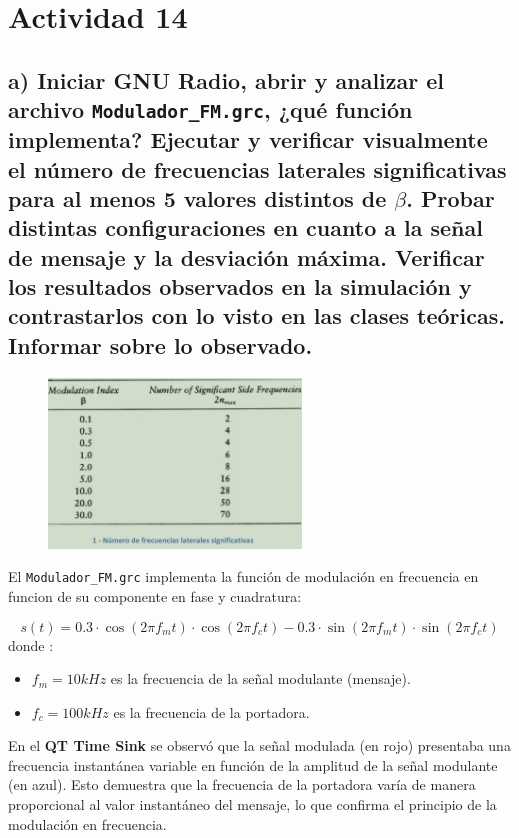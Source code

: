 \section{Actividad 14}

\subsection*{a) Iniciar GNU Radio, abrir y analizar el archivo \texttt{Modulador\_FM.grc}, ¿qué función implementa? Ejecutar y verificar visualmente el número de frecuencias laterales significativas para al menos 
5 valores distintos de $\beta$. Probar distintas configuraciones en cuanto a la señal de mensaje y la desviación máxima. Verificar los resultados observados en la simulación y contrastarlos con lo visto en las clases teóricas. Informar sobre lo observado.}

      \begin{figure}[H]
        \centering
        \includegraphics[width=0.6\textwidth]{imagenes/Parte_2/Actividad_14/fig6.png}
        \label{fig:6}
     \end{figure}

El \texttt{Modulador\_FM.grc} implementa la función de modulación en frecuencia en funcion de su componente en fase y cuadratura:

    \[
        s(t) = 0.3 \cdot \cos(2\pi f_m t) \cdot \cos(2\pi f_c t) - 0.3 \cdot \sin(2\pi f_m t)  \cdot \sin(2\pi f_c t) 
    \]
donde :
\begin{itemize}
    \item $f_m = 10 kHz$ es la frecuencia de la señal modulante (mensaje).
    \item $f_c = 100 kHz$ es la frecuencia de la portadora.
\end{itemize}


En el \textbf{QT Time Sink} se observó que la señal modulada (en rojo) presentaba una frecuencia instantánea variable en función de la amplitud de la señal modulante (en azul). Esto demuestra que la frecuencia de la portadora varía de manera proporcional al valor instantáneo del mensaje, lo que confirma el principio de la modulación en frecuencia.

